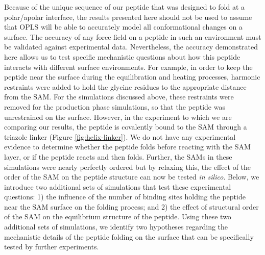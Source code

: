 Because of the unique sequence of our peptide that was designed to fold at a polar/apolar interface, the results presented here should not be used to assume that OPLS will be able to accurately model all conformational changes on a surface. 
The accuracy of any force field on a peptide in such an environment must be validated against experimental data. 
Nevertheless, the accuracy demonstrated here allows us to test specific mechanistic questions about how this peptide interacts with different surface environments. 
For example, in order to keep the peptide near the surface during the equilibration and heating processes, harmonic restraints were added to hold the glycine residues to the appropriate distance from the SAM. 
For the simulations discussed above, these restraints were removed for the production phase simulations, so that the peptide was unrestrained on the surface. 
However, in the experiment to which we are comparing our results, the peptide is covalently bound to the SAM through a triazole linker (Figure \ref{fig:helix-linker}). 
We do not have any experimental evidence to determine whether the peptide folds before reacting with the SAM layer, or if the peptide reacts and then folds. 
Further, the SAMs in these simulations were nearly perfectly ordered but by relaxing this, the effect of the order of the SAM on the peptide structure can now be tested \emph{in silico}. 
Below, we introduce two additional sets of simulations that test these experimental questions: 
1) the influence of the number of binding sites holding the peptide near the SAM surface on the folding process; and 
2) the effect of structural order of the SAM on the equilibrium structure of the peptide. 
Using these two additional sets of simulations, we identify two hypotheses regarding the mechanistic details of the peptide folding on the surface that can be specifically tested by further experiments. 

